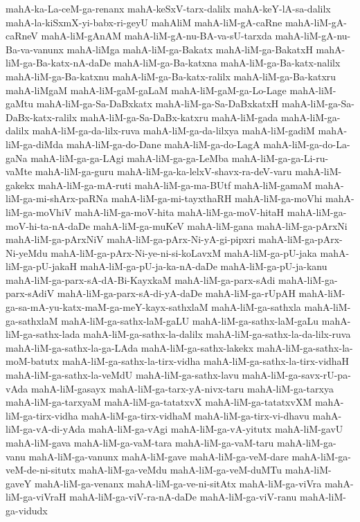 {mahA-ka-La-ceM-ga-renanx
mahA-keSxV-tarx-dalilx
mahA-keY-lA-sa-dalilx
mahA-la-kiSxmX-yi-babx-ri-geyU
mahAliM
mahA-liM-gA-caRne
mahA-liM-gA-caRneV
mahA-liM-gAnAM
mahA-liM-gA-nu-BA-va-sU-tarxda
mahA-liM-gA-nu-Ba-va-vanunx
mahA-liMga
mahA-liM-ga-Bakatx
mahA-liM-ga-BakatxH
mahA-liM-ga-Ba-katx-nA-daDe
mahA-liM-ga-Ba-katxna
mahA-liM-ga-Ba-katx-nalilx
mahA-liM-ga-Ba-katxnu
mahA-liM-ga-Ba-katx-ralilx
mahA-liM-ga-Ba-katxru
mahA-liMgaM
mahA-liM-gaM-gaLaM
mahA-liM-gaM-ga-Lo-Lage
mahA-liM-gaMtu
mahA-liM-ga-Sa-DaBxkatx
mahA-liM-ga-Sa-DaBxkatxH
mahA-liM-ga-Sa-DaBx-katx-ralilx
mahA-liM-ga-Sa-DaBx-katxru
mahA-liM-gada
mahA-liM-ga-dalilx
mahA-liM-ga-da-lilx-ruva
mahA-liM-ga-da-lilxya
mahA-liM-gadiM
mahA-liM-ga-diMda
mahA-liM-ga-do-Dane
mahA-liM-ga-do-LagA
mahA-liM-ga-do-La-gaNa
mahA-liM-ga-ga-LAgi
mahA-liM-ga-ga-LeMba
mahA-liM-ga-ga-Li-ru-vaMte
mahA-liM-ga-guru
mahA-liM-ga-ka-lelxV-shavx-ra-deV-varu
mahA-liM-gakekx
mahA-liM-ga-mA-ruti
mahA-liM-ga-ma-BUtf
mahA-liM-gamaM
mahA-liM-ga-mi-shArx-paRNa
mahA-liM-ga-mi-tayxthaRH
mahA-liM-ga-moVhi
mahA-liM-ga-moVhiV
mahA-liM-ga-moV-hita
mahA-liM-ga-moV-hitaH
mahA-liM-ga-moV-hi-ta-nA-daDe
mahA-liM-ga-muKeV
mahA-liM-gana
mahA-liM-ga-pArxNi
mahA-liM-ga-pArxNiV
mahA-liM-ga-pArx-Ni-yA-gi-pipxri
mahA-liM-ga-pArx-Ni-yeMdu
mahA-liM-ga-pArx-Ni-ye-ni-si-koLavxM
mahA-liM-ga-pU-jaka
mahA-liM-ga-pU-jakaH
mahA-liM-ga-pU-ja-ka-nA-daDe
mahA-liM-ga-pU-ja-kanu
mahA-liM-ga-parx-sA-dA-Bi-KayxkaM
mahA-liM-ga-parx-sAdi
mahA-liM-ga-parx-sAdiV
mahA-liM-ga-parx-sA-di-yA-daDe
mahA-liM-ga-rUpAH
mahA-liM-ga-sa-mA-yu-katx-maM-ga-meY-kayx-sathxlaM
mahA-liM-ga-sathxla
mahA-liM-ga-sathxlaM
mahA-liM-ga-sathx-laM-gaLU
mahA-liM-ga-sathx-laM-gaLu
mahA-liM-ga-sathx-lada
mahA-liM-ga-sathx-la-dalilx
mahA-liM-ga-sathx-la-da-lilx-ruva
mahA-liM-ga-sathx-la-ga-LAda
mahA-liM-ga-sathx-lakekx
mahA-liM-ga-sathx-la-moM-batutx
mahA-liM-ga-sathx-la-tirx-vidha
mahA-liM-ga-sathx-la-tirx-vidhaH
mahA-liM-ga-sathx-la-veMdU
mahA-liM-ga-sathx-lavu
mahA-liM-ga-savx-rU-pa-vAda
mahA-liM-gasayx
mahA-liM-ga-tarx-yA-nivx-taru
mahA-liM-ga-tarxya
mahA-liM-ga-tarxyaM
mahA-liM-ga-tatatxvX
mahA-liM-ga-tatatxvXM
mahA-liM-ga-tirx-vidha
mahA-liM-ga-tirx-vidhaM
mahA-liM-ga-tirx-vi-dhavu
mahA-liM-ga-vA-di-yAda
mahA-liM-ga-vAgi
mahA-liM-ga-vA-yitutx
mahA-liM-gavU
mahA-liM-gava
mahA-liM-ga-vaM-tara
mahA-liM-ga-vaM-taru
mahA-liM-ga-vanu
mahA-liM-ga-vanunx
mahA-liM-gave
mahA-liM-ga-veM-dare
mahA-liM-ga-veM-de-ni-situtx
mahA-liM-ga-veMdu
mahA-liM-ga-veM-duMTu
mahA-liM-gaveY
mahA-liM-ga-venanx
mahA-liM-ga-ve-ni-sitAtx
mahA-liM-ga-viVra
mahA-liM-ga-viVraH
mahA-liM-ga-viV-ra-nA-daDe
mahA-liM-ga-viV-ranu
mahA-liM-ga-vidudx
}
